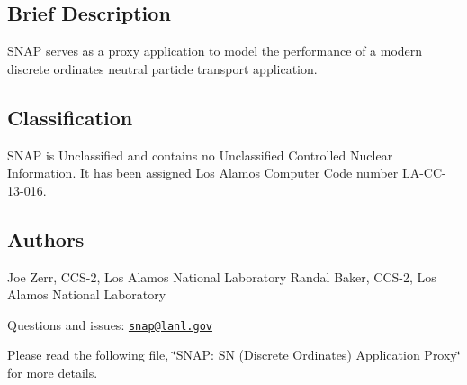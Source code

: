 \subsection*{Brief Description}

S\-N\-A\-P serves as a proxy application to model the performance of a modern discrete ordinates neutral particle transport application.

\subsection*{Classification}

S\-N\-A\-P is Unclassified and contains no Unclassified Controlled Nuclear Information. It has been assigned Los Alamos Computer Code number L\-A-\/\-C\-C-\/13-\/016.

\subsection*{Authors}

Joe Zerr, C\-C\-S-\/2, Los Alamos National Laboratory Randal Baker, C\-C\-S-\/2, Los Alamos National Laboratory

Questions and issues\-: \href{mailto:snap@lanl.gov}{\tt snap@lanl.\-gov}

Please read the following file, \char`\"{}\-S\-N\-A\-P\-: S\-N (\-Discrete Ordinates) Application Proxy\char`\"{} for more details. 